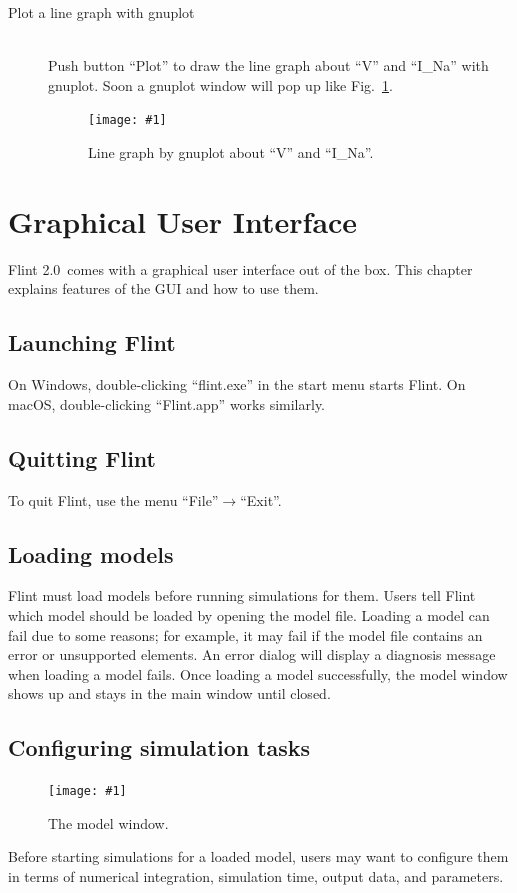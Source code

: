 \documentclass[a4paper,10pt]{report}
\def\FlintVersion{2.0}
\def\Flint{Flint \FlintVersion}
\newcommand\FigureOfImage[2]{\begin{figure}[h]
  \centering
  \texttt{[image: \#1]}
  \caption{#2}\label{fig:#1}
\end{figure}}
\begin{document}
\begin{description}
\item[Plot a line graph with gnuplot] \hfill \\
Push button ``Plot'' to draw the line graph about ``V'' and ``I\_Na'' with
gnuplot. Soon a gnuplot window will pop up like Fig.~\ref{fig:hh-gnuplot}.
\FigureOfImage{hh-gnuplot}{Line graph by gnuplot about ``V'' and ``I\_Na''.}
\end{description}



\chapter{Graphical User Interface}
\Flint\ comes with a graphical user interface out of the box. This chapter
explains features of the GUI and how to use them.

\section{Launching Flint}
On Windows, double-clicking ``flint.exe'' in the start menu starts Flint.
On macOS, double-clicking ``Flint.app'' works similarly.

\section{Quitting Flint}
To quit Flint, use the menu ``File''$\rightarrow$``Exit''.

\section{Loading models}
Flint must load models before running simulations for them.
Users tell Flint which model should be loaded by opening the model file.
Loading a model can fail due to some reasons; for example, it may fail if
the model file contains an error or unsupported elements.
An error dialog will display a diagnosis message when loading a model fails.
Once loading a model successfully, the model window shows up and stays
in the main window until closed.

\section{Configuring simulation tasks}
\FigureOfImage{lr}{The model window.}
Before starting simulations for a loaded model, users may want to configure them
in terms of numerical integration, simulation time, output data, and parameters.
\end{document}
